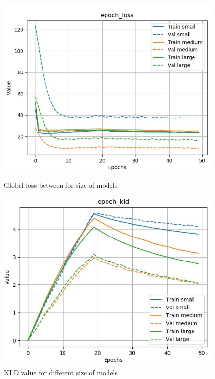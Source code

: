 \documentclass[12pt]{report}
\begin{document}
\begin{figure}[htbp]
    \begin{minipage}{0.5\textwidth}
        \begin{center}
            \includegraphics[width=\textwidth]{images/experiences/size/loss-comparison-size.jpg}
            \caption{Global loss between for size of models}
            \label{fig:loss-comparison-size}
        \end{center}
    \end{minipage} \hfill
    \begin{minipage}{0.5 \textwidth}
        \begin{center}
            \includegraphics[width=\textwidth]{images/experiences/size/kld-comparison-size.jpg}
            \caption{KLD value for different size of models}
            \label{fig:kld-comparison-size}
        \end{center}
    \end{minipage}
\end{figure}
\end{document}

